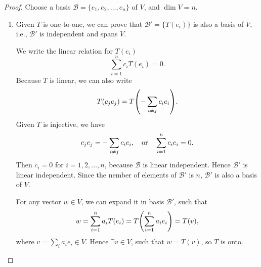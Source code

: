 \documentclass[10pt]{article}
\begin{document}
\begin{proof}
	Choose a basis $\mathcal{B} = \{e_1,e_2, \dots, e_n\}$ of $V$, and $\dim{V} = n$.

	\begin{enumerate}
		\item Given $T$ is one-to-one, we can prove that $\mathcal{B'} = \{T (e_i)\}$ is also a basis of $V$, i.e., $\mathcal{B'}$ is independent and spans $V$.

		We write the linear relation for $T(e_i)$
		\begin{equation}
			\sum_{i=1}^{n} c_i T(e_i) = 0.
		\end{equation}
		Because $T$ is linear, we can also write
		\begin{equation}
			T(c_j e_j) = T\qty(-\sum_{i\neq j} c_i e_i).
		\end{equation}
		Given $T$ is injective, we have
		\begin{equation}
			c_j e_j = -\sum_{i\neq j} c_i e_i, \qor \sum_{i=1}^n c_i e_i = 0.
		\end{equation}
		Then $c_i = 0$ for $i=1,2,\dots,n$, because $\mathcal{B}$ is linear independent. Hence
		$\mathcal{B'}$ is linear independent. Since the nember of elements of $\mathcal{B'}$ is $n$, $\mathcal{B'}$ is also a basis of $V$.

		For any vector $w \in V$, we can expand it in basis $\mathcal{B'}$, such that
		\begin{equation}
			w = \sum_{i=1}^n a_i T(e_i) = T \qty(\sum_{i=1}^n a_i e_i) = T(v),
		\end{equation}
		where $v = \sum_i a_i e_i \in V$. Hence $\exists v\in V$, such that $w = T(v)$, so $T$ is onto.


\end{enumerate}
\end{proof}
\end{document}
